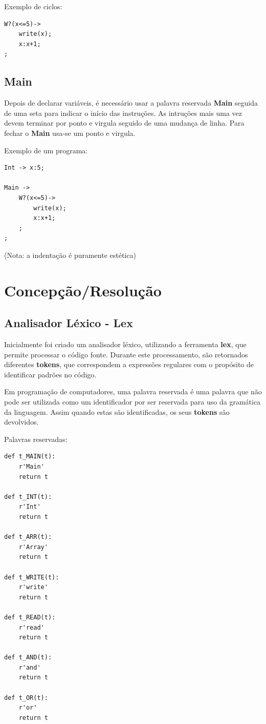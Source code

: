 \documentclass{article}
\begin{document}
Exemplo de ciclos:
\begin{lstlisting}[firstnumber=0]
W?(x<=5)->
    write(x);
    x:x+1;
;
\end{lstlisting}


\subsection{Main}
\setlength{\parindent}{5ex} Depois de declarar variáveis, é necessário usar a palavra reservada \textbf{Main} seguida de uma seta para indicar o início das instruções. As intruções mais uma vez devem terminar por ponto e virgula seguido de uma mudança de linha. Para fechar o \textbf{Main} usa-se um ponto e virgula.

Exemplo de um programa:
\begin{lstlisting}[firstnumber=0]
Int -> x:5;

Main ->
    W?(x<=5)->
        write(x);
        x:x+1;
    ;
;
\end{lstlisting}
(Nota: a indentação é puramente estética)
\vspace{1CM}

\section{Concepção/Resolução} \label{sec:Concepção/Resolução}


\subsection{Analisador Léxico - Lex}
\setlength{\parindent}{5ex}Inicialmente foi criado um analisador léxico, utilizando a ferramenta \textbf{lex}, que permite processar o código fonte. Durante este processamento, são retornados diferentes \textbf{tokens}, que correspondem a expressões regulares com o propósito de identificar padrões no código.
\par Em programação de computadores, uma palavra reservada é uma palavra que não pode ser utilizada como um identificador por ser reservada para uso da gramática da linguagem. Assim quando estas são identificadas, os seus \textbf{tokens} são devolvidos.
\par Palavras reservadas:

\begin{lstlisting}[]
def t_MAIN(t):
    r'Main'
    return t

def t_INT(t):
    r'Int'
    return t

def t_ARR(t):
    r'Array'
    return t

def t_WRITE(t):
    r'write'
    return t

def t_READ(t):
    r'read'
    return t
    
def t_AND(t):
    r'and'
    return t

def t_OR(t):
    r'or'
    return t
\end{lstlisting}
\end{document}
